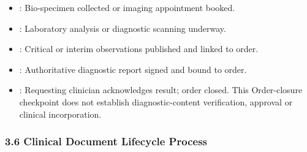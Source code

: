 \begin{itemize}
\begin{itemize}
\item 
\texttt{}: Bio-specimen collected or imaging appointment booked.



\item 
\texttt{}: Laboratory analysis or diagnostic scanning underway.



\item 
\texttt{}: Critical or interim observations published and linked to order.



\item 
\texttt{}: Authoritative diagnostic report signed and bound to order.



\item 
\texttt{}: Requesting clinician acknowledges result; order closed. This Order-closure checkpoint does not establish diagnostic-content verification, approval or clinical incorporation.



\end{itemize}


\end{itemize}
\label{rad:processes:150}

\par\smallskip
{}\label{rad:processes:152}
\subsubsection*{3.6 Clinical Document Lifecycle Process}
\label{rad:processes:153}

